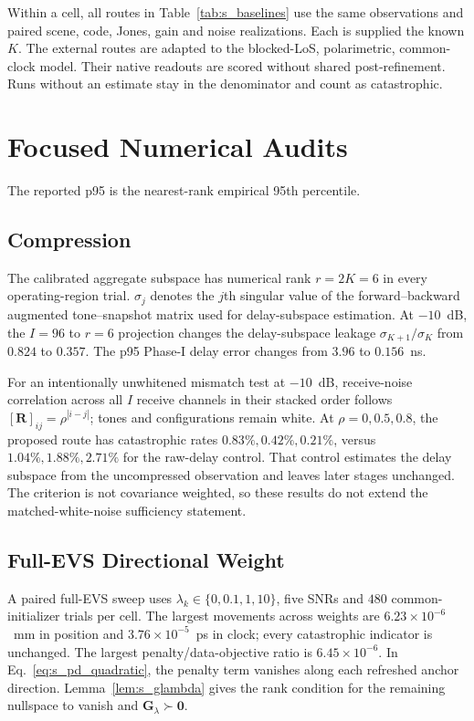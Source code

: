 \documentclass[journal,letterpaper]{IEEEtran}
\newcommand{\bG}{\mathbf{G}}
\newcommand{\bR}{\mathbf{R}}
\begin{document}
\noindent\begin{minipage}{\columnwidth}
\setlength{\parindent}{1em}
Within a cell, all routes in Table~\ref{tab:s_baselines} use the same
observations and paired scene, code, Jones, gain and noise realizations.
Each is supplied the known $K$.  The external routes are adapted to the
blocked-LoS, polarimetric, common-clock model.  Their native readouts are
scored without shared post-refinement.  Runs without an estimate stay in the
denominator and count as catastrophic.
\end{minipage}

\section{Focused Numerical Audits}

The reported p95 is the nearest-rank empirical 95th percentile.

\subsection{Compression}

The calibrated aggregate subspace has numerical rank $r=2K=6$ in every
operating-region trial.  $\sigma_j$ denotes the $j$th singular value of the
forward--backward augmented tone--snapshot matrix used for delay-subspace
estimation. At $-10$~dB, the $I=96$ to $r=6$ projection
changes the delay-subspace leakage $\sigma_{K+1}/\sigma_K$ from $0.824$ to
$0.357$.  The p95 Phase-I delay error changes from $3.96$ to $0.156$~ns.

For an intentionally unwhitened mismatch test at $-10$~dB, receive-noise
correlation across all $I$ receive channels in their stacked order follows
$[\bR]_{ij}=\rho^{|i-j|}$; tones and configurations remain white.  At
$\rho=0,0.5,0.8$, the proposed route has catastrophic rates
$0.83\%,0.42\%,0.21\%$, versus $1.04\%,1.88\%,2.71\%$ for the raw-delay
control.  That control estimates the delay subspace from the uncompressed
observation and leaves later stages unchanged.  The criterion is not
covariance weighted, so these results do not extend the matched-white-noise
sufficiency statement.

\subsection{Full-EVS Directional Weight}

A paired full-EVS sweep uses $\lambda_k\in\{0,0.1,1,10\}$, five SNRs and
$480$ common-initializer trials per cell.  The largest movements across
weights are $6.23\times10^{-6}$~mm in position and
$3.76\times10^{-5}$~ps in clock; every catastrophic indicator is unchanged.
The largest penalty/data-objective ratio is $6.45\times10^{-6}$.  In
Eq.~\eqref{eq:s_pd_quadratic}, the penalty term vanishes along each refreshed
anchor direction.  Lemma~\ref{lem:s_glambda} gives the rank condition for
the remaining nullspace to vanish and $\bG_\lambda\succ\mathbf0$.
\end{document}
